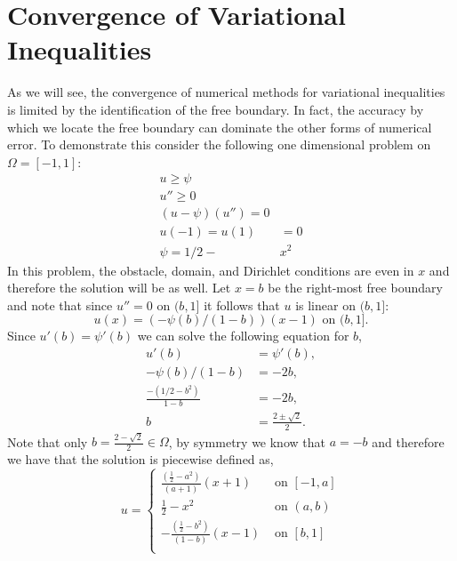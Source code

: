 \documentclass[12 pt]{report}
\begin{document}
\section{Convergence of Variational Inequalities}
As we will see, the convergence of numerical methods for variational inequalities is limited by the identification of the free boundary. In fact, the accuracy by which we locate the free boundary can dominate the other forms of numerical error. To demonstrate this consider the following one dimensional problem on $\Omega = [-1,1]$:
\begin{align}
  u \geq \psi\\
  u'' \geq 0\\
  (u - \psi)(u'') = 0\\
  u(-1) = u(1) &= 0\\
  \psi = 1/2 - &x^2
\end{align}
In this problem, the obstacle, domain, and Dirichlet conditions are even in $x$ and therefore the solution will be as well. Let $x = b$ be the right-most free boundary and note that since $u'' = 0$ on $(b, 1]$ it follows that $u$ is linear on $(b, 1]$:
\begin{equation}
  u(x) = (-\psi(b)/(1 - b))(x - 1)  \text{ on } (b, 1].
\end{equation}
Since $u'(b) = \psi'(b)$ we can solve the following equation for $b$, 
\begin{align}
  u'(b) &= \psi'(b),\\
  -\psi(b)/(1 - b) &= -2b,\\
  \frac{-(1/2 - b^2)}{1 - b} &= -2b,\\
  b &= \frac{2 \pm \sqrt{2}}{2}.
\end{align}
Note that only $b = \frac{2 - \sqrt{2}}{2} \in \Omega$, by symmetry we know that $a = -b$ and therefore we have that the solution is piecewise defined as, 
\begin{equation}
  u = \begin{cases}
    \frac{(\frac{1}{2} - a^2)}{(a + 1)}(x + 1) & \text{ on } [-1, a]\\ 
    \frac{1}{2} - x^2 & \text{ on } (a, b)\\
    -\frac{(\frac{1}{2} - b^2)}{(1 - b)}(x - 1) & \text{ on } [b, 1]\\ 
  \end{cases}
\end{equation}
\end{document}
